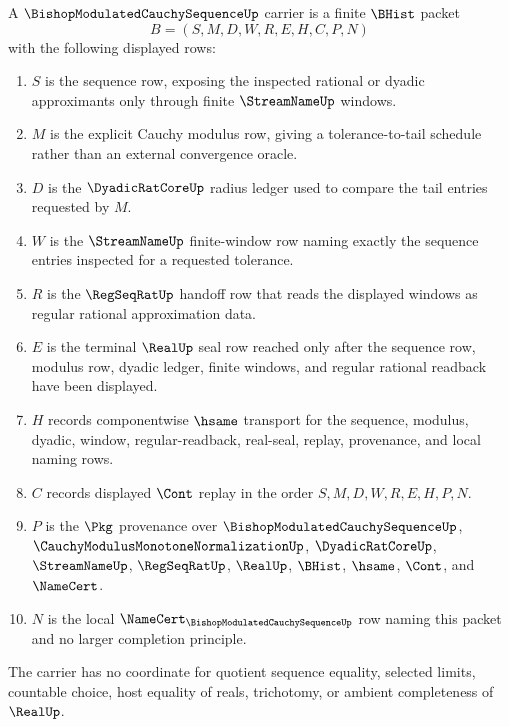 \begin{definition}
\label{def:bishop-modulated-cauchy-sequence-carrier}
A $\BishopModulatedCauchySequenceUp$ carrier is a finite $\BHist$ packet
$$
B=(S,M,D,W,R,E,H,C,P,N)
$$
with the following displayed rows:
\begin{enumerate}
\item $S$ is the sequence row, exposing the inspected rational or dyadic approximants only through finite $\StreamNameUp$ windows.
\item $M$ is the explicit Cauchy modulus row, giving a tolerance-to-tail schedule rather than an external convergence oracle.
\item $D$ is the $\DyadicRatCoreUp$ radius ledger used to compare the tail entries requested by $M$.
\item $W$ is the $\StreamNameUp$ finite-window row naming exactly the sequence entries inspected for a requested tolerance.
\item $R$ is the $\RegSeqRatUp$ handoff row that reads the displayed windows as regular rational approximation data.
\item $E$ is the terminal $\RealUp$ seal row reached only after the sequence row, modulus row, dyadic ledger, finite windows, and regular rational readback have been displayed.
\item $H$ records componentwise $\hsame$ transport for the sequence, modulus, dyadic, window, regular-readback, real-seal, replay, provenance, and local naming rows.
\item $C$ records displayed $\Cont$ replay in the order $S,M,D,W,R,E,H,P,N$.
\item $P$ is the $\Pkg$ provenance over $\BishopModulatedCauchySequenceUp$, $\CauchyModulusMonotoneNormalizationUp$, $\DyadicRatCoreUp$, $\StreamNameUp$, $\RegSeqRatUp$, $\RealUp$, $\BHist$, $\hsame$, $\Cont$, and $\NameCert$.
\item $N$ is the local $\NameCert_{\BishopModulatedCauchySequenceUp}$ row naming this packet and no larger completion principle.
\end{enumerate}
The carrier has no coordinate for quotient sequence equality, selected limits, countable choice, host equality of reals, trichotomy, or ambient completeness of $\RealUp$.
\end{definition}

